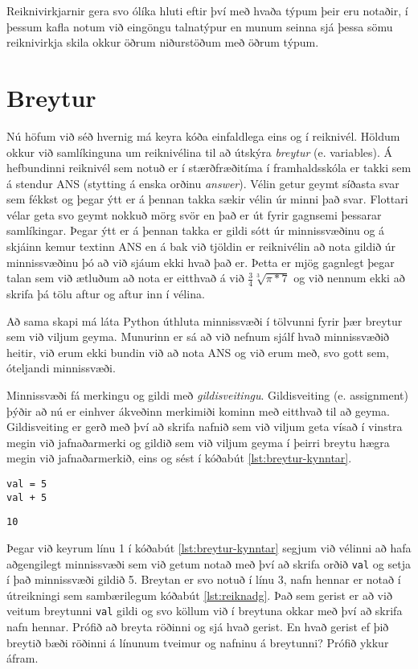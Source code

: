 Reiknivirkjarnir gera svo ólíka hluti eftir því með hvaða týpum þeir eru notaðir, í þessum kafla notum við eingöngu talnatýpur en munum seinna sjá þessa sömu reiknivirkja skila okkur öðrum niðurstöðum með öðrum týpum.

\section{Breytur}
Nú höfum við séð hvernig má keyra kóða einfaldlega eins og í reiknivél.
Höldum okkur við samlíkinguna um reiknivélina til að útskýra \emph{breytur} (e. variables).
Á hefbundinni reiknivél sem notuð er í stærðfræðitíma í framhaldsskóla er takki sem á stendur ANS (stytting á enska orðinu \textit{answer}).
Vélin getur geymt síðasta svar sem fékkst og þegar ýtt er á þennan takka sækir vélin úr minni það svar.
Flottari vélar geta svo geymt nokkuð mörg svör en það er út fyrir gagnsemi þessarar samlíkingar.
Þegar ýtt er á þennan takka er gildi sótt úr minnissvæðinu og á skjáinn kemur textinn ANS en á bak við tjöldin er reiknivélin að nota gildið úr minnissvæðinu þó að við sjáum ekki hvað það er.
Þetta er mjög gagnlegt þegar talan sem við ætluðum að nota er eitthvað á við $\frac{3}{4}\sqrt[3]{\pi*7} $ og við nennum ekki að skrifa þá tölu aftur og aftur inn í vélina.

Að sama skapi má láta Python úthluta minnissvæði í tölvunni fyrir þær breytur sem við viljum geyma.
Munurinn er sá að við nefnum sjálf hvað minnissvæðið heitir, við erum ekki bundin við að nota ANS og við erum með, svo gott sem, óteljandi minnissvæði.

Minnissvæði fá merkingu og gildi með \textit{gildisveitingu}.
Gildisveiting (e. assignment) þýðir að nú er einhver ákveðinn merkimiði kominn með eitthvað til að geyma.
Gildisveiting er gerð með því að skrifa nafnið sem við viljum geta vísað í vinstra megin við jafnaðarmerki og gildið sem við viljum geyma í þeirri breytu hægra megin við jafnaðarmerkið, eins og sést í kóðabút \ref{lst:breytur-kynntar}.

\begin{lstlisting}[caption=Breytur kynntar, label=lst:breytur-kynntar]
val = 5
val + 5
\end{lstlisting}
\lstset{style=uttak}
\begin{lstlisting}
10
\end{lstlisting}
\lstset{style=venjulegt}

Þegar við keyrum línu 1 í kóðabút \ref{lst:breytur-kynntar} segjum við vélinni að hafa aðgengilegt minnissvæði sem við getum notað með því að skrifa orðið \texttt{val} og setja í það minnissvæði gildið 5.
Breytan er svo notuð í línu 3, nafn hennar er notað í útreikningi sem sambærilegum kóðabút \ref{lst:reiknadg}.
Það sem gerist er að við veitum breytunni \texttt{val} gildi og svo köllum við í breytuna okkar með því að skrifa nafn hennar.
Prófið að breyta röðinni og sjá hvað gerist.
En hvað gerist ef þið breytið bæði röðinni á línunum tveimur og nafninu á breytunni?
Prófið ykkur áfram.

